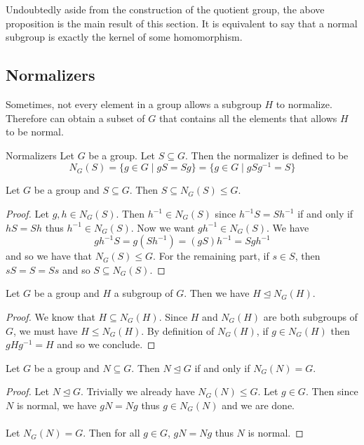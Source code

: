\documentclass[a4paper]{article}
\begin{document}
Undoubtedly aside from the construction of the quotient group, the above proposition is the main result of this section. It is equivalent to say that a normal subgroup is exactly the kernel of some homomorphism. 

\subsection{Normalizers}
Sometimes, not every element in a group allows a subgroup $H$ to normalize. Therefore can obtain a subset of $G$ that  contains all the elements that allows $H$ to be normal. 

\begin{defn}{Normalizers}{} Let $G$ be a group. Let $S\subseteq G$. Then the normalizer is defined to be $$N_G(S)=\{g\in G\;|\;gS=Sg\}=\{g\in G\;|\;gSg^{-1}=S\}$$
\end{defn}

\begin{prp}{}{} Let $G$ be a group and $S\subseteq G$. Then $S\subseteq N_G(S)\leq G$. \tcbline
\begin{proof}
Let $g,h\in N_G(S)$. Then $h^{-1}\in N_G(S)$ since $h^{-1}S=Sh^{-1}$ if and only if $hS=Sh$ thus $h^{-1}\in N_G(S)$. Now we want $gh^{-1}\in N_G(S)$. We have $$gh^{-1}S=g(Sh^{-1})=(gS)h^{-1}=Sgh^{-1}$$ and so we have that $N_G(S)\leq G$. For the remaining part, if $s\in S$, then $sS=S=Ss$ and so $S\subseteq N_G(S)$. 
\end{proof}
\end{prp}

\begin{prp}{}{} Let $G$ be a group and $H$ a subgroup of $G$. Then we have $H\trianglelefteq N_G(H)$. \tcbline
\begin{proof}
We know that $H\subseteq N_G(H)$. Since $H$ and $N_G(H)$ are both subgroups of $G$, we must have $H\leq N_G(H)$. By definition of $N_G(H)$, if $g\in N_G(H)$ then $gHg^{-1}=H$ and so we conclude. 
\end{proof}
\end{prp}

\begin{prp}{}{} Let $G$ be a group and $N\subseteq G$. Then $N\trianglelefteq G$ if and only if $N_G(N)=G$. \tcbline
\begin{proof}
Let $N\trianglelefteq G$. Trivially we already have $N_G(N)\leq G$. Let $g\in G$. Then since $N$ is normal, we have $gN=Ng$ thus $g\in N_G(N)$ and we are done. \\~\\
Let $N_G(N)=G$. Then for all $g\in G$, $gN=Ng$ thus $N$ is normal. 
\end{proof}
\end{prp}
\end{document}
